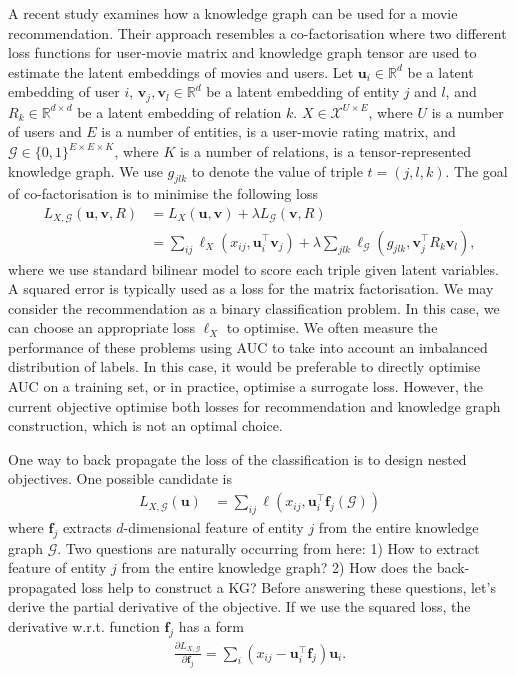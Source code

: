 \documentclass{article} %
\theoremstyle{definition}
\newcommand\bs{\boldsymbol}
\begin{document}
A recent study \cite{Zhang2016} examines how a knowledge graph can be used for a movie recommendation. Their approach resembles a co-factorisation where two different loss functions for user-movie matrix and knowledge graph tensor are used to estimate the latent embeddings of movies and users.
Let $\bs{u}_i \in \mathbb{R}^d$ be a latent embedding of user $i$, $\bs{v}_j, \bs{v}_l \in \mathbb{R}^d$ be a latent embedding of entity $j$ and $l$, and $R_k \in \mathbb{R}^{d\times d}$ be a latent embedding of relation $k$. $X \in \mathcal{X}^{U \times E}$, where $U$ is a number of users and $E$ is a number of entities, is a user-movie rating matrix, and $\mathcal{G} \in \{0,1\}^{E\times E \times K}$, where $K$ is a number of relations, is a tensor-represented knowledge graph. We use $g_{jlk}$ to denote the value of triple $t=(j, l, k)$. The goal of co-factorisation is to minimise the following loss
\begin{align}
L_{X, \mathcal{G}}(\mathbf{u}, \mathbf{v}, R) & = L_X(\mathbf{u}, \mathbf{v}) + \lambda L_\mathcal{G}(\mathbf{v}, R)\\
& = \sum_{ij}\ell_X(x_{ij}, \bs{u}_{i}^\top \bs{v}_j) + \lambda \sum_{jlk}\ell_\mathcal{G}(g_{jlk}, \bs{v}_j^\top R_k \bs{v}_{l}), \label{eqn:two_losses}
\end{align}
where we use standard bilinear model to score each triple given latent variables.
A squared error is typically used as a loss for the matrix factorisation. We may consider the recommendation as a binary classification problem. In this case, we can choose an appropriate loss $\ell_X$ to optimise.  We often measure the performance of these problems using AUC to take into account an imbalanced distribution of labels. In this case, it would be preferable to directly optimise AUC on a training set, or in practice, optimise a surrogate loss. However, the current objective optimise both losses for recommendation and knowledge graph construction, which is not an optimal choice.

One way to back propagate the loss of the classification is to design nested objectives. One possible candidate is
\begin{align}
\label{eqn:obj}
L_{X, \mathcal{G}}(\mathbf{u}) & = \sum_{ij}\ell(x_{ij}, \bs{u}_{i}^\top \bs{f}_j(\mathcal{G}))
\end{align}
where $\bs{f}_j$ extracts $d$-dimensional feature of entity $j$ from the entire knowledge graph $\mathcal{G}$. Two questions are naturally occurring from here: 1) How to extract feature of entity $j$ from the entire knowledge graph? 2) How does the back-propagated loss help to construct a KG? Before answering these questions, let's derive the partial derivative of the objective. If we use the squared loss, the derivative w.r.t. function $\bs{f}_j$ has a form
\begin{align}
\frac{\partial L_{X, \mathcal{G}}}{\partial \bs{f}_j} = \sum_{i}(x_{ij} - \bs{u}_i^\top \bs{f}_j) \bs{u}_i.
\end{align}
\end{document}
